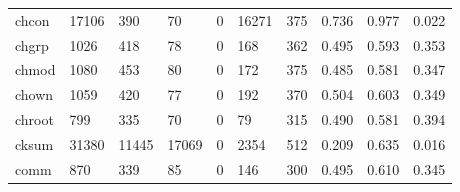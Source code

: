 \begin{longtable}{lp{2.0cm}p{2.0cm}p{2.0cm}p{2.0cm}p{2.0cm}p{2.0cm}p{2.0cm}p{2.0cm}p{2.0cm}}
chcon     &                  17106 &                                390 &                                70 &                                0 &                             16271 &                             375 &                                0.736 &                                  0.977 &                                0.022 \\
chgrp     &                   1026 &                                418 &                                78 &                                0 &                               168 &                             362 &                                0.495 &                                  0.593 &                                0.353 \\
chmod     &                   1080 &                                453 &                                80 &                                0 &                               172 &                             375 &                                0.485 &                                  0.581 &                                0.347 \\
chown     &                   1059 &                                420 &                                77 &                                0 &                               192 &                             370 &                                0.504 &                                  0.603 &                                0.349 \\
chroot    &                    799 &                                335 &                                70 &                                0 &                                79 &                             315 &                                0.490 &                                  0.581 &                                0.394 \\
cksum     &                  31380 &                              11445 &                             17069 &                                0 &                              2354 &                             512 &                                0.209 &                                  0.635 &                                0.016 \\
comm      &                    870 &                                339 &                                85 &                                0 &                               146 &                             300 &                                0.495 &                                  0.610 &                                0.345 \\

\end{longtable}
